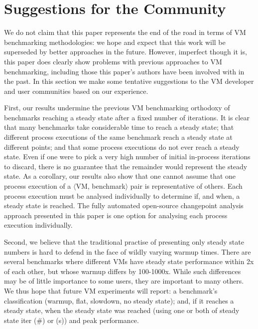 \documentclass[acmsmall]{acmart}\settopmatter{printfolios=true}
\newcommand{\vmbpair}{$\langle$VM, benchmark$\rangle$\xspace}
\begin{document}
\section{Suggestions for the Community}
\label{suggestions}

We do not claim that this paper represents the end of the road in terms of VM
benchmarking methodologies: we hope and expect that this work will be superseded
by better approaches in the future. However, imperfect though it is, this paper
does clearly show problems with previous approaches to VM
benchmarking, including those this paper's authors have been involved with in the past. In this
section we make some tentative suggestions to the VM developer and user
communities based on our experience.

First, our results undermine the previous VM benchmarking orthodoxy of benchmarks
reaching a steady state after a fixed number of iterations. It is clear
that many benchmarks take considerable time to reach a
steady state; that different process executions of the same benchmark reach a
steady state at different points; and that some process executions do not ever
reach a steady state. Even if one were to pick a very high number of initial in-process
iterations to discard, there is no guarantee that the remainder
would represent the steady state. As a corollary, our results also show that one cannot assume
that one process execution of a \vmbpair pair is representative of others. Each
process execution must be analysed individually to determine if, and when, a steady state is
reached. The fully automated open-source changepoint analysis
approach presented in this paper is one option for analysing each process execution individually.

Second, we believe that the traditional practise of presenting only steady state
numbers is hard to defend in the face of wildly varying warmup times. There
are several benchmarks where different VMs have steady state
performance within 2x of each other, but whose warmup differs by 100-1000x.
While such differences may be of little importance to some users,
they are important to many others. We thus hope that future VM experiments will
report: a benchmark's classification (warmup, flat, slowdown, no steady state);
and, if it reaches a steady state, when the steady state was reached (using
one or both of steady state iter (\#) or (s)) and peak performance.
\end{document}
